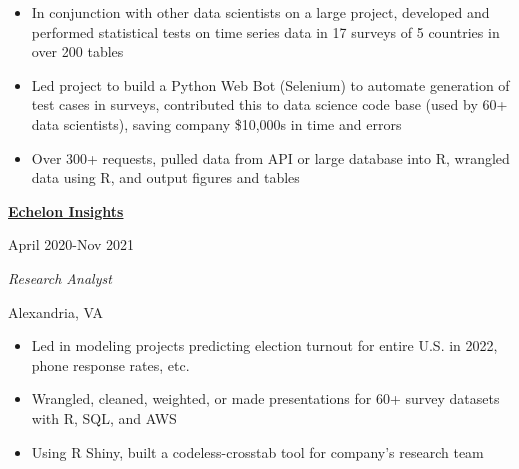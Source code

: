 \documentclass[
  16,
]{article}
\providecommand{\tightlist}{%
  \setlength{\itemsep}{0pt}\setlength{\parskip}{0pt}}\usepackage{longtable,booktabs,array}
\begin{document}
\begin{itemize}
\tightlist
\item
  In conjunction with other data scientists on a large project,
  developed and performed statistical tests on time series data in 17
  surveys of 5 countries in over 200 tables
\item
  Led project to build a Python Web Bot (Selenium) to automate
  generation of test cases in surveys, contributed this to data science
  code base (used by 60+ data scientists), saving company \$10,000s in
  time and errors
\item
  Over 300+ requests, pulled data from API or large database into R,
  wrangled data using R, and output figures and tables
\end{itemize}

\vspace{7pt}

\begin{large}
  \begin{multicols}{2}
    \begin{flushleft}{\bf \href{https://echeloninsights.com/}{Echelon Insights}}\end{flushleft}
    \begin{flushright}April 2020-Nov 2021\end{flushright}
  \end{multicols}
  \vspace{-0.17cm}
  \begin{multicols}{2}
    \begin{flushleft}\textit{Research Analyst}\end{flushleft}
    \begin{flushright}Alexandria, VA\end{flushright}
  \end{multicols}
\end{large}
\vspace{-0.16cm}

\begin{itemize}
\tightlist
\item
  Led in modeling projects predicting election turnout for entire U.S.
  in 2022, phone response rates, etc.
\item
  Wrangled, cleaned, weighted, or made presentations for 60+ survey
  datasets with R, SQL, and AWS
\item
  Using R Shiny, built a codeless-crosstab tool for company's research
  team
\end{itemize}
\end{document}
